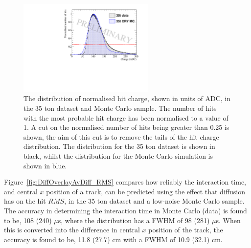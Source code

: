 \begin{figure}
  \centering
  \includegraphics[width=0.6\textwidth]{ChargeCutOverlay}
  \caption[The distribution of normalised hit charge in the 35 ton dataset and a Monte Carlo sample]
          {The distribution of normalised hit charge, shown in units of ADC, in the 35 ton dataset and Monte Carlo sample. The number of hits with the most probable hit charge has been normalised to a value of 1. A cut on the normalised number of hits being greater than 0.25 is shown, the aim of this cut is to remove the tails of the hit charge distribution. The distribution for the 35 ton dataset is shown in black, whilst the distribution for the Monte Carlo simulation is shown in blue.}
  \label{fig:DiffOverlay_ChargeCut}
\end{figure}

Figure~\ref{fig:DiffOverlayAvDiff_RMS} compares how reliably the interaction time, and central $x$ position of a track, can be predicted using the effect that diffusion has on the hit $RMS$, in the 35 ton dataset and a low-noise Monte Carlo sample. The accuracy in determining the interaction time in Monte Carlo (data) is found to be, 108 (240) $\mu$s, where the distribution has a FWHM of 98 (281) $\mu$s. When this is converted into the difference in central $x$ position of the track, the accuracy is found to be, 11.8 (27.7) cm with a FWHM of 10.9 (32.1) cm. \\

